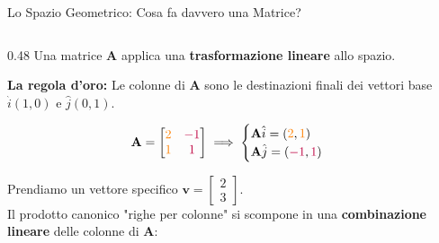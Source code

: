 \documentclass[aspectratio=169, 10pt]{beamer}
\begin{document}
\begin{frame}{Lo Spazio Geometrico: Cosa fa davvero una Matrice?}
    \begin{columns}[T,onlytextwidth]
        \setlength{\columnsep}{0.25cm}
        \begin{column}{0.48\textwidth}
            \scriptsize
            Una matrice $\mathbf{A}$ applica una \textbf{trasformazione lineare} allo spazio. 
            
            \vspace{0.15cm}
            \textbf{La regola d'oro:} Le colonne di $\mathbf{A}$ sono le destinazioni finali dei vettori base $\hat{i}(1,0)$ e $\hat{j}(0,1)$.
            
            \vspace{0.1cm}
            \[
            \mathbf{A} = \begin{bmatrix} \color{orange}2 & \color{purple}-1 \\ \color{orange}1 & \color{purple}1 \end{bmatrix} \implies 
            \begin{cases} 
            \mathbf{A}\hat{i} = (\color{orange}2\color{black}, \color{orange}1\color{black}) \\ 
            \mathbf{A}\hat{j} = (\color{purple}-1\color{black}, \color{purple}1\color{black}) 
            \end{cases}
            \]
            \vspace{0.05cm}
            
            Prendiamo un vettore specifico $\mathbf{v} = \begin{bmatrix} 2 \\ 3 \end{bmatrix}$. \\
            Il prodotto canonico "righe per colonne" si scompone in una \textbf{combinazione lineare} delle colonne di $\mathbf{A}$:
            

\end{column}
\end{columns}
\end{frame}
\end{document}
